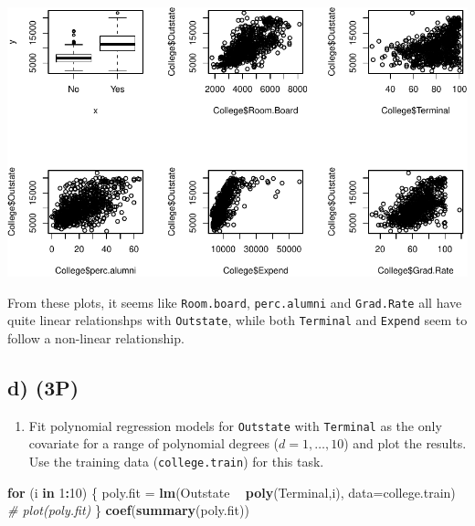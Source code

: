 \documentclass[]{article}
\newenvironment{Shaded}{\begin{snugshade}}{\end{snugshade}}
\newcommand{\CommentTok}[1]{\textcolor[rgb]{0.56,0.35,0.01}{\textit{#1}}}
\newcommand{\ControlFlowTok}[1]{\textcolor[rgb]{0.13,0.29,0.53}{\textbf{#1}}}
\newcommand{\DataTypeTok}[1]{\textcolor[rgb]{0.13,0.29,0.53}{#1}}
\newcommand{\DecValTok}[1]{\textcolor[rgb]{0.00,0.00,0.81}{#1}}
\newcommand{\KeywordTok}[1]{\textcolor[rgb]{0.13,0.29,0.53}{\textbf{#1}}}
\newcommand{\NormalTok}[1]{#1}
\newcommand{\OperatorTok}[1]{\textcolor[rgb]{0.81,0.36,0.00}{\textbf{#1}}}
\newcommand{\StringTok}[1]{\textcolor[rgb]{0.31,0.60,0.02}{#1}}
\providecommand{\tightlist}{%
  \setlength{\itemsep}{0pt}\setlength{\parskip}{0pt}}
\begin{document}
\begin{center}\includegraphics{Compulsory2_Group37_StatLearn_files/figure-latex/2c3-1} \end{center}

From these plots, it seems like \texttt{Room.board},
\texttt{perc.alumni} and \texttt{Grad.Rate} all have quite linear
relationshps with \texttt{Outstate}, while both \texttt{Terminal} and
\texttt{Expend} seem to follow a non-linear relationship.

\hypertarget{d-3p}{%
\subsection{d) (3P)}\label{d-3p}}

\begin{enumerate}
\def\labelenumi{(\roman{enumi})}
\tightlist
\item
  Fit polynomial regression models for \texttt{Outstate} with
  \texttt{Terminal} as the only covariate for a range of polynomial
  degrees (\(d = 1,\ldots,10\)) and plot the results. Use the training
  data (\texttt{college.train}) for this task.
\end{enumerate}

\begin{Shaded}
\begin{Highlighting}[]
\ControlFlowTok{for}\NormalTok{ (i }\ControlFlowTok{in} \DecValTok{1}\OperatorTok{:}\DecValTok{10}\NormalTok{) \{}
\NormalTok{  poly.fit =}\StringTok{ }\KeywordTok{lm}\NormalTok{(Outstate }\OperatorTok{~}\StringTok{ }\KeywordTok{poly}\NormalTok{(Terminal,i), }\DataTypeTok{data=}\NormalTok{college.train)}
  \CommentTok{# plot(poly.fit)  }
\NormalTok{\}}
\KeywordTok{coef}\NormalTok{(}\KeywordTok{summary}\NormalTok{(poly.fit))}
\end{Highlighting}
\end{Shaded}
\end{document}
